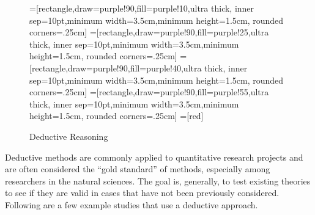 \begin{center}
	\begin{figure}[H]
		=[rectangle,draw=purple!90,fill=purple!10,ultra thick,
		inner sep=10pt,minimum width=3.5cm,minimum height=1.5cm,
		rounded corners=.25cm]
		=[rectangle,draw=purple!90,fill=purple!25,ultra thick,
		inner sep=10pt,minimum width=3.5cm,minimum height=1.5cm,
		rounded corners=.25cm]
		=[rectangle,draw=purple!90,fill=purple!40,ultra thick,
		inner sep=10pt,minimum width=3.5cm,minimum height=1.5cm,
		rounded corners=.25cm]
		=[rectangle,draw=purple!90,fill=purple!55,ultra thick,
		inner sep=10pt,minimum width=3.5cm,minimum height=1.5cm,
		rounded corners=.25cm]			
		=[red]
		\caption{Deductive Reasoning}
		\label{02:fig06}
	\end{figure}
\end{center}

Deductive methods are commonly applied to quantitative research projects and are often considered the ``gold standard'' of methods, especially among researchers in the natural sciences. The goal is, generally, to test existing theories to see if they are valid in cases that have not been previously considered. Following are a few example studies that use a deductive approach.

